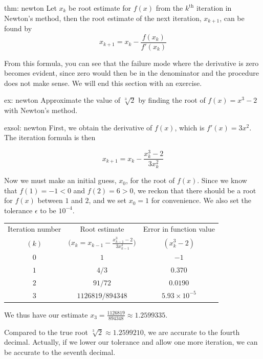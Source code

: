 \newpage

\begin{theo}{thm: newton}
    Let $x_k$ be root estimate for $f(x)$ from the $k^{\text{th}}$ iteration in Newton's method, then the root estimate of the next iteration, $x_{k+1}$, can be found by
    \[x_{k+1} = x_k - \frac{f(x_k)}{f'(x_k)}\]
\end{theo}

From this formula, you can see that the failure mode where the derivative is zero becomes evident, since zero would then be in the denominator and the procedure does not make sense.  We will end this section with an exercise.

\begin{ex}[]{ex: newton}
    Approximate the value of $\sqrt[3]{2}$ by finding the root of $f(x) = x^3 - 2$ with Newton's method.
\end{ex}

\begin{exsol}[]{exsol: newton}
    First, we obtain the derivative of $f(x)$, which is $f'(x) = 3x^2$.  The iteration formula is then
    
    \[x_{k+1} = x_k-\frac{x_k^3-2}{3x_k^2}\]
    
    Now we must make an initial guess, $x_0$, for the root of $f(x)$.  Since we know that $f(1) = -1 < 0$ and $f(2) = 6 > 0$, we reckon that there should be a root for $f(x)$ between $1$ and $2$, and we set $x_0 = 1$ for convenience.  We also set the tolerance $\epsilon$ to be $10^{-4}$.
    
    \vspace{0.3cm}
    
    \begin{center}
        \begin{tabular}{ccc}
            Iteration number & Root estimate & Error in function value\\
            $(k)$ & $\Big(x_k = x_{k-1}-\frac{x_{k-1}^3-2}{3x_{k-1}^2}\Big)$ & $(x_k^3-2)$\\
            \hline
            $0$ & $1$ & $-1$\\
            $1$ & $4/3$ & $0.370$\\
            $2$ & $91/72$ & $0.0190$\\
            $3$ & $1126819/894348$ & $5.93\times 10^{-5}$
        \end{tabular}
    \end{center}
    
    We thus have our estimate $x_3 = \frac{1126819}{894348} \approx 1.2599335$.  
    
    Compared to the true root $\sqrt[3]{2} \approx 1.2599210$, we are accurate to the fourth decimal.  Actually, if we lower our tolerance and allow one more iteration, we can be accurate to the seventh decimal.
    \label{tab: newton_iteration_ex}
\end{exsol}

